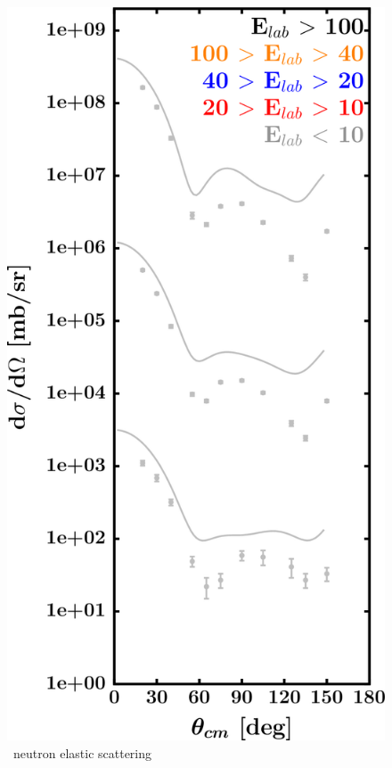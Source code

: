 \begin{figure}[hbtp]
\begin{minipage}{0.47\textwidth}
        \includegraphics[width=\textwidth]{figures/ni64_neutronElastic.png}
        \caption*{\niFour\ neutron elastic scattering}
        \label{DOMFitData_ni64_neutron_elastic}
    \end{minipage}
\end{figure}
\vspace{0.70in}

